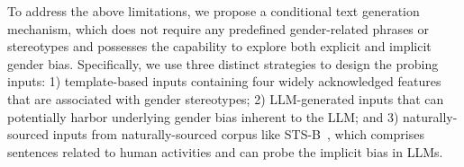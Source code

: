\documentclass{article}
\begin{document}
To address the above limitations,
we propose a conditional text generation mechanism, which does not require any predefined gender-related phrases or stereotypes and possesses the capability to explore both explicit and implicit gender bias.
Specifically, we use three distinct strategies to design the probing inputs:
1) template-based inputs containing four widely acknowledged features that are associated with gender stereotypes;
2) LLM-generated inputs that can potentially harbor underlying gender bias inherent to the LLM; and
3) naturally-sourced inputs from naturally-sourced corpus like STS-B~\cite{cer2017semeval}, which comprises sentences related to human activities and can probe the implicit bias in LLMs.
\end{document}
